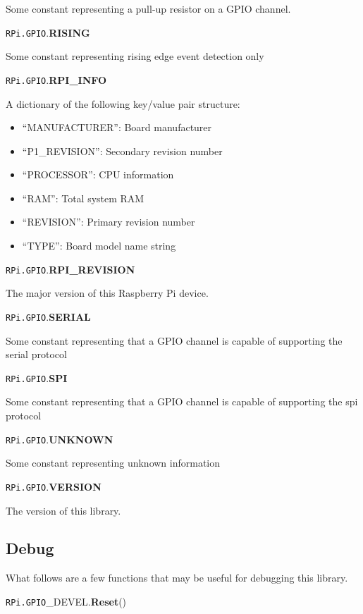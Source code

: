 \documentclass[12pt]{article}
\begin{document}
Some constant representing a pull-up resistor on a GPIO channel.

\noindent \texttt{RPi.GPIO}.\textbf{RISING}

Some constant representing rising edge event detection only


\noindent \texttt{RPi.GPIO}.\textbf{RPI\_INFO}

A dictionary of the following key/value pair structure:
\begin{itemize}
    \item ``MANUFACTURER'': Board manufacturer
    \item ``P1\_REVISION'': Secondary revision number
    \item ``PROCESSOR'': CPU information
    \item ``RAM'': Total system RAM
    \item ``REVISION'': Primary revision number
    \item ``TYPE'': Board model name string
\end{itemize}


\noindent \texttt{RPi.GPIO}.\textbf{RPI\_REVISION}

The major version of this Raspberry Pi device.

\noindent \texttt{RPi.GPIO}.\textbf{SERIAL}

Some constant representing that a GPIO channel is capable of supporting the serial protocol


\noindent \texttt{RPi.GPIO}.\textbf{SPI}

Some constant representing that a GPIO channel is capable of supporting the spi protocol

\noindent \texttt{RPi.GPIO}.\textbf{UNKNOWN}

Some constant representing unknown information


\noindent \texttt{RPi.GPIO}.\textbf{VERSION}

The version of this library.

\medskip \medskip

\subsection{Debug}

What follows are a few functions that may be useful for debugging this library.

\noindent \texttt{RPi.GPIO}\_DEVEL.\textbf{Reset}()
        
\end{document}

